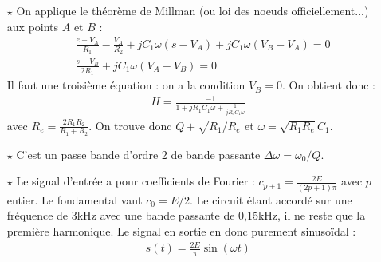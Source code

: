 \documentclass{report}
\begin{document}
\begin{itemize}

	\item[$\star$] On applique le théorème de Millman (ou loi des noeuds officiellement...) aux points $A$ et $B$ :
	\begin{align*}
		&\frac{e-V_A}{R_1}-\frac{V_A}{R_2}+jC_1\omega(s-V_A)+jC_1\omega(V_B-V_A)=0 \\
		&\frac{s-V_B}{2R_1}+jC_1\omega( V_A-V_B) = 0
	\end{align*}
	Il faut une troisième équation : on a la condition $V_B=0$. On obtient donc :
	\begin{align*}
		H=\frac{-1}{1+jR_1C_1\omega+\frac{1}{jR_eC_1\omega}}
	\end{align*}
	avec $R_e=\frac{2R_1R_2}{R_1+R_2}$. On trouve donc $Q+\sqrt{R_1/R_e}$ et $\omega=\sqrt{R_1R_e}C_1$.

	\item[$\star$] C'est un passe bande d'ordre 2 de bande passante $\Delta\omega=\omega_0/Q$.
	
	\item[$\star$] Le signal d'entrée a pour coefficients de Fourier : $c_{p+1}=\frac{2E}{(2p+1)\pi}$ avec $p$ entier. Le fondamental vaut $c_0=E/2$. Le circuit étant accordé sur une fréquence de 3kHz avec une bande passante de 0,15kHz, il ne reste que la première harmonique. Le signal en sortie en donc purement sinusoïdal : 
	\begin{align*}
		s(t)=\frac{2E}{\pi}\sin(\omega t)
	\end{align*}
	
\end{itemize}
\end{document}
